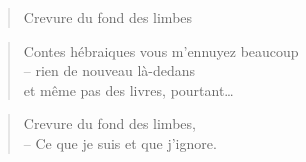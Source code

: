  \begin{verse}
    Crevure du fond des limbes
  \end{verse}
  \begin{verse}
    Contes hébraiques vous m’ennuyez beaucoup\\
    -- rien de nouveau là-dedans\\
    et même pas des livres, pourtant…
  \end{verse}
  \begin{verse}
    Crevure du fond des limbes,\\
    -- Ce que je suis et que j’ignore.
  \end{verse}
